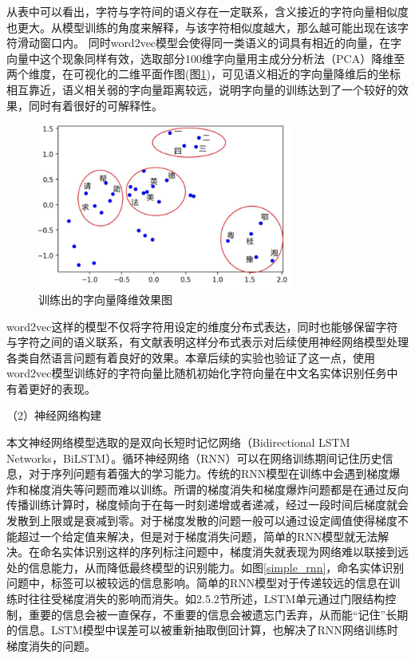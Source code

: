 \documentclass[winfonts,master,oneside,nobackinfo]{njuthesis}
\begin{document}
从表中可以看出，字符与字符间的语义存在一定联系，含义接近的字符向量相似度也更大。从模型训练的角度来解释，与该字符相似度越大，那么越可能出现在该字符滑动窗口内。
同时word2vec模型会使得同一类语义的词具有相近的向量，在字向量中这个现象同样有效，选取部分100维字向量用主成分分析法（PCA）降维至两个维度，在可视化的二维平面作图(图\ref{charVecPCA})，可见语义相近的字向量降维后的坐标相互靠近，语义相关弱的字向量距离较远，说明字向量的训练达到了一个较好的效果，同时有着很好的可解释性。

\begin{figure}[h]
\centering
\includegraphics[width=0.75\textwidth]{./figure/字向量降维.jpg}
\caption{训练出的字向量降维效果图}
\label{charVecPCA}
\end{figure}

word2vec这样的模型不仅将字符用设定的维度分布式表达，同时也能够保留字符与字符之间的语义联系，有文献\cite{Yoon}表明这样分布式表示对后续使用神经网络模型处理各类自然语言问题有着良好的效果。本章后续的实验也验证了这一点，使用word2vec模型训练好的字符向量比随机初始化字符向量在中文名实体识别任务中有着更好的表现。

（2）神经网络构建

本文神经网络模型选取的是双向长短时记忆网络（Bidirectional LSTM Networks，BiLSTM）。循环神经网络（RNN）可以在网络训练期间记住历史信息，对于序列问题有着强大的学习能力。传统的RNN模型在训练中会遇到梯度爆炸和梯度消失等问题而难以训练。所谓的梯度消失和梯度爆炸问题都是在通过反向传播训练计算时，梯度倾向于在每一时刻递增或者递减，经过一段时间后梯度就会发散到上限或是衰减到零。对于梯度发散的问题一般可以通过设定阈值使得梯度不能超过一个给定值来解决，但是对于梯度消失问题，简单的RNN模型就无法解决。在命名实体识别这样的序列标注问题中，梯度消失就表现为网络难以联接到远处的信息能力，从而降低最终模型的识别能力。如图\ref{simple_rnn}，命名实体识别问题中，标签可以被较远的信息影响。简单的RNN模型对于传递较远的信息在训练时往往受梯度消失的影响而消失。如2.5.2节所述，LSTM单元通过门限结构控制，重要的信息会被一直保存，不重要的信息会被遗忘门丢弃，从而能“记住”长期的信息。LSTM模型中误差可以被重新抽取倒回计算，也解决了RNN网络训练时梯度消失的问题。
\end{document}
